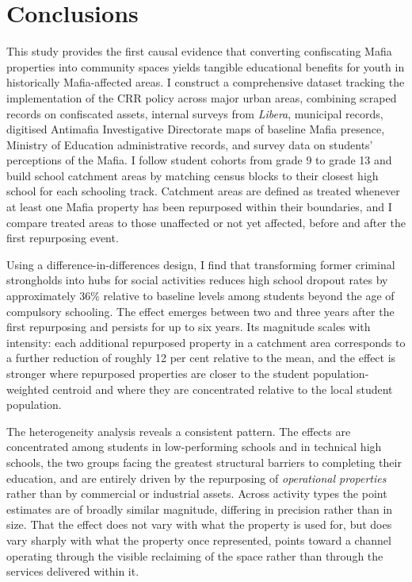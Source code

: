 \documentclass[12pt]{article}
\theoremstyle{plain}
\theoremstyle{plain}
\theoremstyle{plain}
\theoremstyle{definition}
\theoremstyle{plain}
\theoremstyle{definition}
\theoremstyle{plain}
\theoremstyle{remark}
\theoremstyle{definition}
\theoremstyle{definition}
\theoremstyle{plain}
\begin{document}
\FloatBarrier
\section{Conclusions}
\label{sec:jmp_conclusions}

This study provides the first causal evidence that converting confiscating Mafia properties into community spaces yields tangible educational benefits for youth in historically Mafia-affected areas. I construct a comprehensive dataset tracking the implementation of the CRR policy across major urban areas, combining scraped records on confiscated assets, internal surveys from \emph{Libera}, municipal records, digitised Antimafia Investigative Directorate maps of baseline Mafia presence, Ministry of Education administrative records, and survey data on students' perceptions of the Mafia. I follow student cohorts from grade 9 to grade 13 and build school catchment areas by matching census blocks to their closest high school for each schooling track. Catchment areas are defined as treated whenever at least one Mafia property has been repurposed within their boundaries, and I compare treated areas to those unaffected or not yet affected, before and after the first repurposing event.

Using a difference-in-differences design, I find that transforming former criminal strongholds into hubs for social activities reduces high school dropout rates by approximately 36\% relative to baseline levels among students beyond the age of compulsory schooling. The effect emerges between two and three years after the first repurposing and persists for up to six years. Its magnitude scales with intensity: each additional repurposed property in a catchment area corresponds to a further reduction of roughly 12 per cent relative to the mean, and the effect is stronger where repurposed properties are closer to the student population-weighted centroid and where they are concentrated relative to the local student population.

The heterogeneity analysis reveals a consistent pattern. The effects are concentrated among students in low-performing schools and in technical high schools, the two groups facing the greatest structural barriers to completing their education, and are entirely driven by the repurposing of \emph{operational properties} rather than by commercial or industrial assets. Across activity types the point estimates are of broadly similar magnitude, differing in precision rather than in size. That the effect does not vary with what the property is used for, but does vary sharply with what the property once represented, points toward a channel operating through the visible reclaiming of the space rather than through the services delivered within it.
\end{document}
